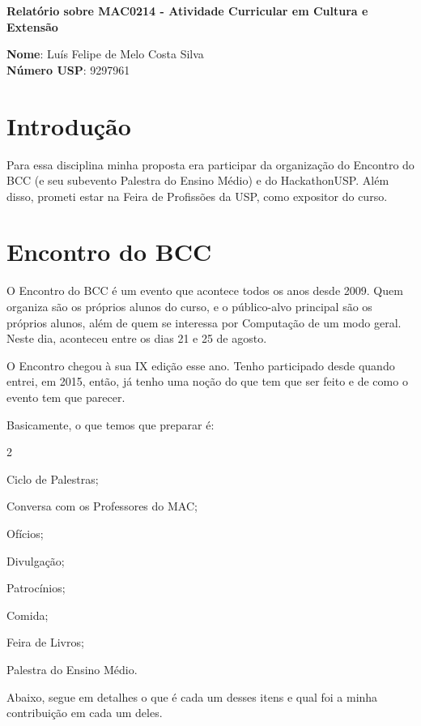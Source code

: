 \documentclass[12pt,letterpaper]{article}
\begin{document}
	\begin{center}
		\Large \bf
		Relatório sobre MAC0214 - Atividade Curricular em Cultura e Extensão
	\end{center}
	
	\textbf{Nome}: Luís Felipe de Melo Costa Silva \\
	\textbf{Número USP}: 9297961
	
	\section*{Introdução}
	Para essa disciplina minha proposta era participar da organização do Encontro do BCC (e seu subevento Palestra do Ensino Médio) e do HackathonUSP. Além disso, prometi estar na Feira de Profissões da USP, como expositor do curso.
	
	\section{Encontro do BCC}
	O Encontro do BCC é um evento que acontece todos os anos desde 2009. Quem organiza são os próprios alunos do curso, e o público-alvo principal são os próprios alunos, além de quem se interessa por Computação de um modo geral. Neste dia, aconteceu entre os dias 21 e 25 de agosto.
	
	O Encontro chegou à sua IX edição esse ano. Tenho participado desde quando entrei, em 2015, então, já tenho uma noção do que tem que ser feito e de como o evento tem que parecer. 
	
	Basicamente, o que temos que preparar é:
	
	\begin{itemize}
	\end{itemize}

	Abaixo, segue em detalhes o que é cada um desses itens e qual foi a minha contribuição em cada um deles.
	
\end{document}
